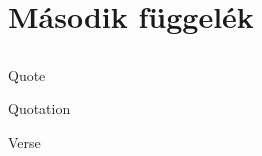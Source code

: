 \documentclass[twoside, 12pt]{article}
\begin{document}
\subsection{}
\subsection{}
\label{subs: fuggelek}
\section{Második függelék}
\subsection{}
\subsection{}
\clearpage
Quote
\begin{quote}
\lipsum[1-2]
\end{quote}

Quotation
\begin{quotation}
\lipsum[2-3]
\end{quotation}

Verse
\begin{verse}
\hulipsum[4-5]
\end{verse}
\end{document}

